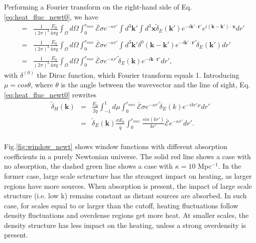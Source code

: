 \documentclass[onecolumn]{emulateapj}
\begin{document}
Performing a Fourier transform on the right-hand side of Eq.\ref{eq:heat_fluc_newt0}, we have
\begin{eqnarray}
  \label{eq:right}
  &=& \frac{1}{(2\pi)^3} \frac{E_0}{4\pi\bar{\dot{q}}}\int_{\Omega}d\Omega\int_0^{r_{max}} \bar{ \mathcal{E}}\sigma  e^{-\kappa r'} \int d^3\mathbf{k'}\int d^3\mathbf{x} \tilde{\delta}_E(\mathbf{k'})e^{-i\mathbf{k'}\cdot{\mathbf{r}'}} e^{i(\mathbf{k}-\mathbf{k'})\cdot\mathbf{x}}  dr'\\ \nonumber
  &=&\frac{1}{(2\pi)^3} \frac{E_0}{4\pi\bar{\dot{q}}} \int_{\Omega}d\Omega\int_0^{r_{max}}   \bar{\mathcal{E}}\sigma  e^{-\kappa r'} \int d^3\mathbf{k'} \delta^{0}(\mathbf{k}-\mathbf{k}')e^{-i\mathbf{k'}\cdot{\mathbf{r}'}} \tilde{\delta}_E(\mathbf{k'})    dr'\\ \nonumber
  &=&\frac{1}{(2\pi)^3} \frac{E_0}{4\pi\bar{\dot{q}}} \int_{\Omega}d\Omega\int_0^{r_{max}}  \bar{ \mathcal{E}}\sigma  e^{-\kappa r'}  \tilde{\delta}_E(\mathbf{k}) e^{-i\mathbf{k}\cdot{\mathbf{r}'}}  dr',
\end{eqnarray}
with $\delta^{(0)}$ the Dirac function, which Fourier transform equals 1. Introducing $\mu=cos\theta$, where $\theta$ is the angle between the wavevector and the line of sight, Eq. \ref{eq:heat_fluc_newt0} rewrites
\begin{eqnarray}
  \label{eq:heat_fluc_newt1}
  \tilde{\delta}_H(\mathbf{k})&=&  \frac{E_0}{\bar{2\dot{q}}} \int_{-1}^{1} d\mu \int_0^{r_{max}}  \bar{\mathcal{E}}\sigma  e^{-\kappa r'}  \tilde{\delta}_E(k) e^{-ikr'\mu}  dr'\\ \nonumber
&=&\tilde{\delta}_E(\mathbf{k})\frac{\sigma E_0}{\bar{\dot{q}}}\int_0^{r_{max}} \frac{sin(kr')}{kr'}   \bar{\mathcal{E}}  e^{-\kappa r'}   dr'.\\ \nonumber
\end{eqnarray}

Fig.\ref{fig:window_newt} shows  window functions with different absorption coefficients in a purely Newtonian universe. The solid red line shows a case with no absorption, the dashed green line shows a case with $\kappa=10$ Mpc$^{-1}$.  In the former case, large scale sctructure has the strongest impact on heating, as larger regions have more sources. When absorption is present,  the impact of large scale structure (i.e. low k) remains constant as distant sources are absorbed. In such case, for scales equal to or larger than the cutoff, heating fluctuations follow density fluctuations and overdense regions get more heat. At smaller scales, the density structure has less impact on the heating, unless a strong overdensity is present.  
\end{document}
